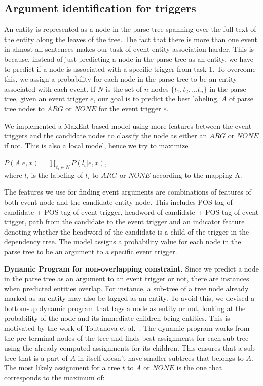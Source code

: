 \subsection{Argument identification for triggers}
An entity is represented as a node in the parse tree spanning over the full text of the entity along the leaves of the tree. The fact that there is more than one event in almost all sentences makes our task of event-entity association harder. This is because, instead of just predicting a node in the parse tree as an entity, we have to predict if a node is associated with a specific trigger from task 1. To overcome this, we assign a probability for each node in the parse tree to be an entity associated with each event. If $N$ is the set of $n$ nodes $\{t_1, t_2, ... t_n\}$ in the parse tree, given an event trigger $e$, our goal is to predict the best labeling, $A$ of parse tree nodes to $ARG$ or $NONE$ for the event trigger $e$.

We implemented a MaxEnt based model using more features between the event triggers and the candidate nodes to classify the node as either an $ARG$ or $NONE$ if not. This is also a local model, hence we try to maximize

$P(A | e, x) = \prod_{t_{i}\in N} P(l_{i} | e, x) $, \\
where $l_i$ is the labeling of $t_i$ to $ARG$ or $NONE$ according to the mapping A.

The features we use for finding event arguments are combinations of features of both event node and the candidate entity node. This includes POS tag of candidate + POS tag of event trigger, headword of candidate + POS tag of event trigger, path from the candidate to the event trigger and an indicator feature denoting whether the headword of the candidate is a child of the trigger in the dependency tree. The model assigns a probability value for each node in the parse tree to be an argument to a specific event trigger.

{\bf Dynamic Program for non-overlapping constraint.} Since we predict a node in the parse tree as an argument to an event trigger or not, there are instances when predicted entities overlap. For instance, a sub-tree of a tree node already marked as an entity may also be tagged as an entity. To avoid this, we devised a bottom-up dynamic program that tags a node as entity or not, looking at the probability of the node and its immediate children being entities. This is motivated by the work of Toutanova et al.~. The dynamic program works from the pre-terminal nodes of the tree and finds best assignments for each sub-tree using the already computed assignments for its children. This ensures that a sub-tree that is a part of $A$ in itself doesn't have smaller subtrees that belongs to $A$. The most likely assignment for a tree $t$  to $A$ or $NONE$ is the one that corresponds to the maximum of:


